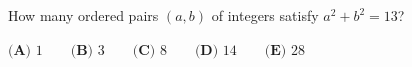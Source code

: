 How many ordered pairs $(a,b)$ of integers satisfy $a^2+b^2=13$?

$\textbf{(A) }1\qquad\textbf{(B) }3\qquad\textbf{(C) }8\qquad\textbf{(D) }14\qquad\textbf{(E) }28$

